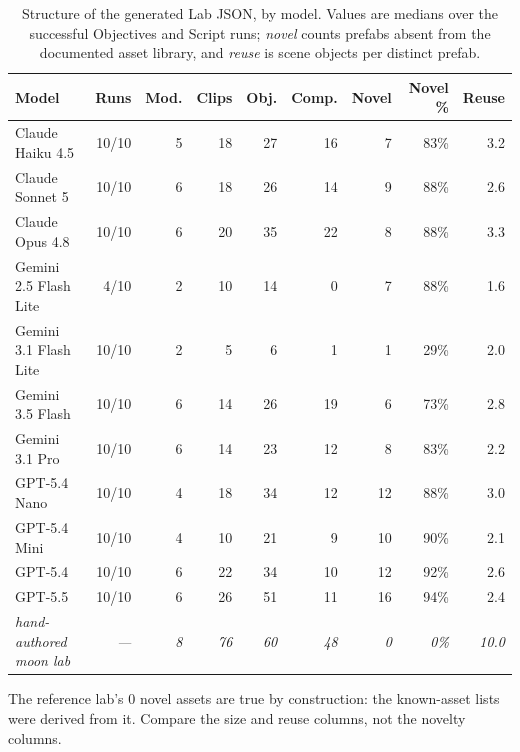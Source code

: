 \begin{table}[htbp]
  \centering
  \small
  \caption{Structure of the generated Lab JSON, by model. Values are medians over the successful Objectives and Script runs; \emph{novel} counts prefabs absent from the documented asset library, and \emph{reuse} is scene objects per distinct prefab.}
  \label{tab:json-lab-structure}
  \begin{tabular}{lrrrrrrrr}
    \toprule
    \textbf{Model} & \textbf{Runs} & \textbf{Mod.} & \textbf{Clips} & \textbf{Obj.} & \textbf{Comp.} & \textbf{Novel} & \textbf{Novel \%} & \textbf{Reuse} \\
    \midrule
    Claude Haiku 4.5 & 10/10 & 5 & 18 & 27 & 16 & 7 & 83\% & 3.2 \\
    Claude Sonnet 5 & 10/10 & 6 & 18 & 26 & 14 & 9 & 88\% & 2.6 \\
    Claude Opus 4.8 & 10/10 & 6 & 20 & 35 & 22 & 8 & 88\% & 3.3 \\
    \addlinespace
    Gemini 2.5 Flash Lite & 4/10 & 2 & 10 & 14 & 0 & 7 & 88\% & 1.6 \\
    Gemini 3.1 Flash Lite & 10/10 & 2 & 5 & 6 & 1 & 1 & 29\% & 2.0 \\
    Gemini 3.5 Flash & 10/10 & 6 & 14 & 26 & 19 & 6 & 73\% & 2.8 \\
    Gemini 3.1 Pro & 10/10 & 6 & 14 & 23 & 12 & 8 & 83\% & 2.2 \\
    \addlinespace
    GPT-5.4 Nano & 10/10 & 4 & 18 & 34 & 12 & 12 & 88\% & 3.0 \\
    GPT-5.4 Mini & 10/10 & 4 & 10 & 21 & 9 & 10 & 90\% & 2.1 \\
    GPT-5.4 & 10/10 & 6 & 22 & 34 & 10 & 12 & 92\% & 2.6 \\
    GPT-5.5 & 10/10 & 6 & 26 & 51 & 11 & 16 & 94\% & 2.4 \\
    \addlinespace
    \itshape hand-authored moon lab & \itshape --- & \itshape 8 & \itshape 76 & \itshape 60 & \itshape 48 & \itshape 0 & \itshape 0\% & \itshape 10.0 \\
    \bottomrule
  \end{tabular}
  \par\smallskip\footnotesize The reference lab's 0 novel assets are true by construction: the known-asset lists were derived from it. Compare the size and reuse columns, not the novelty columns.
\end{table}

